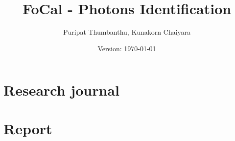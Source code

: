\documentclass[b5paper, 11pt, openleft]{memoir}
\begin{document}
\frontmatter

\title{FoCal - Photons Identification}
\author{Puripat Thumbanthu, Kunakorn Chaiyara}
\date{Version: \today}
\maketitle

\tableofcontents*
\listoftables

\mainmatter

\part{Research journal}




\part{Report}
\label{part:report}



\end{document}
